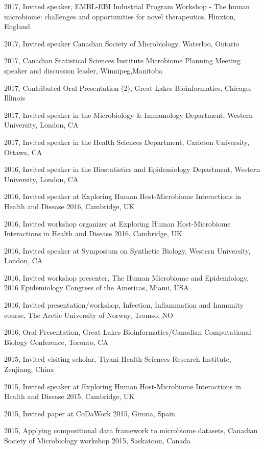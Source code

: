 \documentclass[11pt]{article}
\begin{document}
\begin{description}
\item 2017,  Invited speaker, EMBL-EBI Industrial Program Workshop - The human microbiome: challenges and opportunities for novel therapeutics, Hinxton, England
\item 2017,  Invited speaker Canadian Society of Microbiology, Waterloo, Ontario 
\item 2017,  Canadian Statistical Sciences Institute Microbiome Planning Meeting speaker and discussion leader, Winnipeg,Manitoba
\item 2017,  Contributed Oral Presentation (2), Great Lakes Bioinformatics, Chicago, Illinois
\item 2017,	 Invited speaker in the Microbiology \& Immunology Department, Western University, London,  CA
\item 2017,	 Invited speaker in the Health Sciences Department, Carleton University, Ottawa,  CA
\item 2016,	 Invited speaker in the Biostatistics and Epidemiology Department, Western University, London,  CA
\item 2016,  Invited speaker at Exploring Human Host-Microbiome Interactions in Health and Disease 2016, Cambridge, UK
\item 2016,  Invited workshop organizer at Exploring Human Host-Microbiome Interactions in Health and Disease 2016, Cambridge, UK 
\item 2016,	 Invited speaker at Symposium on Synthetic Biology, Western University, London,  CA
\item 2016,  Invited workshop presenter, The Human Microbiome and Epidemiology, 2016 Epidemiology Congress of the Americas, Miami, USA
\item 2016,  Invited presentation/workshop, Infection, Inflammation and Immunity course, The Arctic University of Norway, Tromso, NO
\item 2016,  Oral Presentation, Great Lakes Bioinformatics/Canadian Computational Biology Conference, Toronto, CA
\item 2015, Invited visiting scholar, Tiyani Health Sciences Research Institute, Zenjiang, China
\item 2015,  Invited speaker at Exploring Human Host-Microbiome Interactions in Health and Disease 2015, Cambridge, UK
\item 2015,  Invited paper at CoDaWork 2015, Girona, Spain
\item 2015,  Applying compositional data framework to microbiome datasets,  Canadian Society of Microbiology workshop 2015, Saskatoon, Canada

\end{description}
\end{document}
